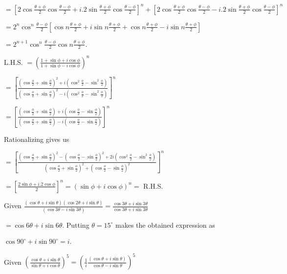   $= \left[2\cos\frac{\theta + \phi}{2}\cos\frac{\theta - \phi}{2} + i.2\sin\frac{\theta
    + \phi}{2}\cos\frac{\theta - \phi}{2}\right]^n + \left[2\cos\frac{\theta + \phi}{2}\cos\frac{\theta
    - \phi}{2} - i.2\sin\frac{\theta + \phi}{2}\cos\frac{\theta - \phi}{2}\right]^n$

  $= 2^n\cos^n\frac{\theta - \phi}{2}\left[\cos n\frac{\theta + \phi}{2} + i\sin n\frac{\theta + \phi}{2}
  + \cos n\frac{\theta + \phi}{2} - i\sin n\frac{\theta + \phi}{2}\right]$

  $= 2^{n + 1}\cos^n\frac{\theta - \phi}{2}\cos n\frac{\theta + \phi}{2}$.
\item L.H.S. $= \left(\frac{1 + \sin\phi + i\cos\phi}{1 + \sin\phi - i\cos\phi}\right)^n$

  $= \left[\frac{\left(\cos\frac{\phi}{2} + \sin\frac{\phi}{2}\right)^2 + i\left(\cos^2\frac{\phi}{2}
    - \sin^2\frac{\phi}{2}\right)}{\left(\cos\frac{\phi}{2} + \sin\frac{\phi}{2}\right)^2 -
    i\left(\cos^2\frac{\phi}{2} - \sin^2\frac{\phi}{2}\right)}\right]^n$

  $= \left[\frac{\left(\cos\frac{\phi}{2} + \sin\frac{\phi}{2}\right) + i\left(\cos\frac{\phi}{2}
    - \sin\frac{\phi}{2}\right)}{\left(\cos\frac{\phi}{2} + \sin\frac{\phi}{2}\right) -
    i\left(\cos\frac{\phi}{2} - \sin\frac{\phi}{2}\right)}\right]^n$

  Rationalizing gives us

  $= \left[\frac{\left(\cos\frac{\phi}{2} + \sin\frac{\phi}{2}\right)^2 - \left(\cos\frac{\phi}{2}
      - \sin\frac{\phi}{2}\right)^2 + 2i\left(\cos^2\frac{\phi}{2}
      - \sin^2\frac{\phi}{2}\right)}{\left(\cos\frac{\phi}{2} + \sin\frac{\phi}{2}\right)^2
      + \left(\cos\frac{\phi}{2} - \sin\frac{\phi}{2}\right)^2}\right]^n$

  $= \left[\frac{2\sin\phi + i.2\cos\phi}{2}\right]^n = (\sin\phi + i\cos\phi)^n =$ R.H.S.
\item Given $\frac{(\cos\theta + i\sin\theta)(\cos2\theta +
  i\sin\theta)}{(\cos3\theta - i\sin3\theta)} = \frac{\cos3\theta + i\sin3\theta}{\cos3\theta +
  i\sin3\theta}$

  $= \cos6\theta + i\sin6\theta$. Putting $\theta = 15^\circ$ makes the obtained expression as

  $\cos90^\circ + i\sin90^\circ = i$.
\item Given $\left(\frac{\cos\theta + i\sin\theta}{\sin\theta + i\cos\theta}\right)^5
  = \left(\frac{1}{i}\frac{(\cos\theta + i\sin\theta)}{\cos\theta - i\sin\theta}\right)^5$

